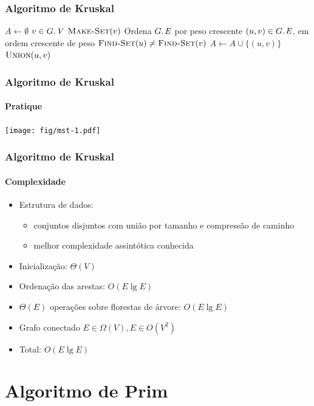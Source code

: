\documentclass{beamer}
\begin{document}
\begin{frame}
\frametitle{Algoritmo de Kruskal}

\begin{codebox}
\li $A \gets \emptyset$
\li \For $v \in \attrib{G}{V}$
\li \Do $\textnormal{\scshape Make-Set}(v)$
    \End
\li Ordena $\attrib{G}{E}$ por peso crescente
\li \For $(u, v) \in \attrib{G}{E}$, em ordem crescente de peso
\li \Do \If $\textnormal{\scshape Find-Set}(u) \neq \textnormal{\scshape Find-Set}(v)$
\li   \Then $A \gets A \cup \{ (u, v) \}$
\li     $\textnormal{\scshape Union}(u, v)$
      \End
    \End
\end{codebox}

\end{frame}

\begin{frame}
\frametitle{Algoritmo de Kruskal}
\framesubtitle{Pratique}

\begin{center}
\texttt{[image: fig/mst-1.pdf]}
\end{center}

\end{frame}

\begin{frame}
\frametitle{Algoritmo de Kruskal}
\framesubtitle{Complexidade}

\begin{itemize}
\item Estrutura de dados:
\begin{itemize}
\item conjuntos disjuntos com união por tamanho e compressão de caminho
\item melhor complexidade assintótica conhecida
\end{itemize}
\item Inicialização: $\Theta(V)$
\item Ordenação das arestas: $O(E \lg E)$
\item $\Theta(E)$ operações sobre florestas de árvore: $O(E \lg E)$
\item Grafo conectado $E \in \Omega(V), E \in O(V^2)$
\item Total: $O(E \lg E)$
\end{itemize}

\end{frame}

\section{Algoritmo de Prim}
\end{document}

